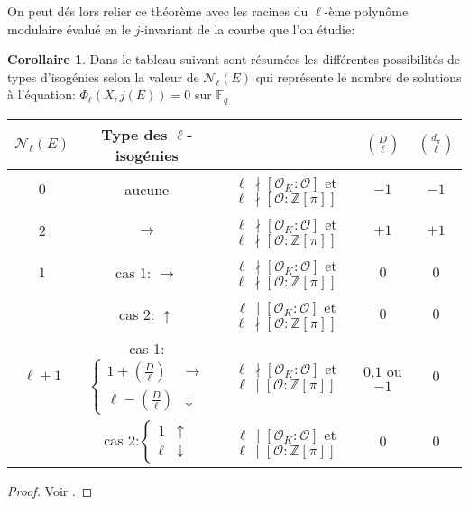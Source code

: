 \documentclass[10pt,a4paper]{book}
\theoremstyle{plain}
\theoremstyle{definition}
\theoremstyle{definition}
\newtheorem{cor}[thm]{Corollaire}
\theoremstyle{definition}
\theoremstyle{definition}
\theoremstyle{remark}
\theoremstyle{remark}
\theoremstyle{definition}
\begin{document}
On peut dés lors relier ce théorème avec les racines du $\ell$-ème polynôme modulaire évalué en le $j$-invariant de la courbe que l'on étudie:
\begin{cor}
\label{cor:tab:vol} 
Dans le tableau suivant sont résumées les différentes possibilités de types d'isogénies selon la valeur de $\mathcal{N}_{\ell}(E)$ qui représente le nombre de solutions à l'équation: $\Phi_{\ell}(X,j(E))=0$ sur $\mathbb{F}_q$
\newline
\begin{tabular}{|c|c|c|c|c|}
\hline 
$\mathcal{N}_{\ell}(E)$ & Type des $\ell$-isogénies &  & $\left(\frac{D}{\ell}\right)$ & $\left(\frac{d_{\pi}}{\ell}\right)$\tabularnewline
\hline 
\hline 
$0$ & aucune & $\ell \,\nmid[\mathcal{O}_{K}:\mathcal{O}]$ et $\ell \,\nmid[\mathcal{O}:\mathbb{Z}[\pi]]$  & $-1$ & $-1$\\
\hline 
$2$ & $\rightarrow$ & $\ell \,\nmid[\mathcal{O}_{K}:\mathcal{O}]$ et $\ell \,\nmid[\mathcal{O}:\mathbb{Z}[\pi]]$  & $+1$ & $+1$\\
\hline 
$1$ & cas 1: $\rightarrow$ & $\ell\,\nmid[\mathcal{O}_{K}:\mathcal{O}]$ et $\ell\,\nmid[\mathcal{O}:\mathbb{Z}[\pi]]$  & $0$ & $0$\\

\cline{2-5} & cas 2: $\uparrow$ & $\ell\,\mid[\mathcal{O}_{K}:\mathcal{O}]$ et $\ell\,\nmid[\mathcal{O}:\mathbb{Z}[\pi]]$  & $0$ & $0$\\
\hline 
$\ell+1$ & cas 1:$\left\{ \begin{array}{cc}
1+\left(\frac{D}{\ell}\right) & \rightarrow\\
\ell-\left(\frac{D}{\ell}\right) & \downarrow
\end{array}\right.$ & $\ell \,\nmid[\mathcal{O}_{K}:\mathcal{O}]$ et $\ell \,\mid[\mathcal{O}:\mathbb{Z}[\pi]]$  & $0$,$1$ ou $-1$ & $0$\\
 
\cline{2-5} & cas 2:$\left\{ \begin{array}{cc}
1 & \uparrow\\
\ell & \downarrow
\end{array}\right.$ & $\ell \,\mid[\mathcal{O}_{K}:\mathcal{O}]$ et $\ell \,\mid[\mathcal{O}:\mathbb{Z}[\pi]]$  & $0$ & $0$ \\
\hline 
\end{tabular}
\end{cor}

\begin{proof}
Voir \cite[§2.3]{FouquetMorain02}.
\end{proof}
\end{document}
